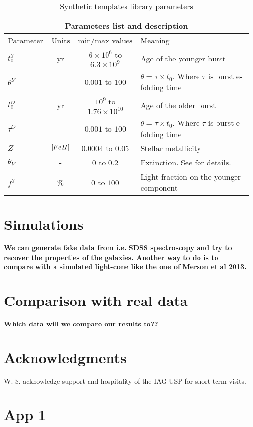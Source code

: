 \documentclass[a4paper, useAMS, usenatbib, hyperpdf]{mn2e}
\begin{document}
\begin{table*}							
\begin{centering}							
\begin{tabular}{lccl}							
\multicolumn{4}{c}{Parameters list and description}\\ \hline							
Parameter	&	Units	&	min/max values	&	Meaning	\\ \hline
$t_0^{Y}$	&	yr	&	$6 \times 10^6$ to $6.3 \times 10^9$	&	Age of the younger burst	\\
$\theta^{Y}$	&	-	&	$0.001$ to $100$	&	$\theta = \tau \times t_0$. Where $\tau$ is burst e-folding time	\\
$t_0^{O}$	&	yr	&	$10^9$ to $1.76 \times 10^{10}$	&	Age of the older burst	\\
$\tau^{O}$	&	-	&	$0.001$ to $100$	&	$\theta = \tau \times t_0$. Where $\tau$ is burst e-folding time	\\
$Z$	&	$[Fe\/H]$	&	$0.0004$ to $0.05$	&	Stellar metallicity	\\
$\theta_V$	&	-	&	$0$ to $0.2$	&	Extinction. See \cite{Charlot.Fall.2000a} for details.	\\
$f^{Y}$	&	\%	&	$0$ to $100$	&	Light fraction on the younger component	\\
\hline							
\end{tabular}							
\end{centering}							
\caption{Synthetic templates library parameters}							
\label{tab:ListOfParameters}							
\end{table*}							

\section{Simulations}
{\bf \color{red} We can generate fake data from i.e. SDSS spectroscopy and try to recover the properties of the galaxies. Another way to do is to compare with a simulated light-cone like the one of Merson et al 2013.}

\section{Comparison with real data}
{\bf \color{red} Which data will we compare our results to??}

\section*{Acknowledgments}
W. S. acknowledge support and hospitality of the IAG-USP for short term visits. 




\appendix

\section{App 1}
\label{app:bias}

 
\end{document}
